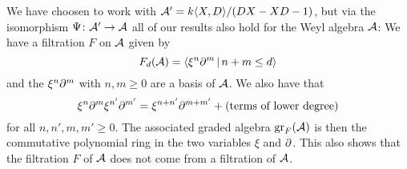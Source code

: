 \begin{fluff}
  We have choosen to work with $\mathcal{A}' = k\!\left\langle X,D \right\rangle\!/(DX-XD-1)$, but via the isomorphism $\Psi \colon \mathcal{A}' \to \mathcal{A}$ all of our results also hold for the Weyl algebra $\mathcal{A}$:
  We have a filtration $F$ on $\mathcal{A}$ given by
  \[
      F_d(\mc{A})
    = \gen{ \xi^n \del^m \suchthat n + m \leq d }
  \]
  and the $\xi^n \partial^m$ with $n, m \geq 0$ are a basis of $\mathcal{A}$.
  We also have that
  \[
      \xi^n \partial^m \xi^{n'} \partial^{m'}
    =   \xi^{n + n'} \partial^{m + m'}
      + (\text{terms of lower degree})
  \]
  for all $n, n', m, m' \geq 0$.
  The associated graded algebra $\operatorname{gr}_F(\mathcal{A})$ is then the commutative polynomial ring in the two variables $\xi$ and $\partial$.
  This also shows that the filtration $F$ of $\mathcal{A}$ does not come from a filtration of $\mathcal{A}$.
\end{fluff}





